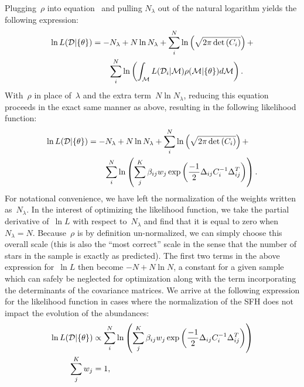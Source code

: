 \documentclass[ms.tex]{subfiles}
\begin{document}
Plugging~$\rho$ into equation~ and pulling
$N_\lambda$ out of the natural logarithm yields the following expression:
\begin{equation}\begin{split}
\ln L(\mathcal{D} | \{\theta\}) &= -N_\lambda + N \ln N_\lambda +
\sum_i^N \ln \left(\sqrt{2\pi \det{(C_i)}}\right) +
\\
&\qquad \sum_i^N \ln \left(
\int_{\mathcal{M}} L(\mathcal{D}_i | \mathcal{M}) \rho(\mathcal{M} | \{\theta\})
d\mathcal{M} \right).
\end{split}\end{equation}
With~$\rho$ in place of~$\lambda$ and the extra term~$N \ln N_\lambda$,
reducing this equation proceeds in the exact same manner as above, resulting
in the following likelihood function:
\begin{equation}\begin{split}
\ln L(\mathcal{D} | \{\theta\}) &= -N_\lambda + N \ln N_\lambda +
\sum_i^N \ln \left(\sqrt{2\pi \det{(C_i)}}\right) +
\\
&\qquad \sum_i^N \ln \left(
\sum_j^K \beta_{ij} w_j
\exp\left(\frac{-1}{2}\Delta_{ij} C_i^{-1} \Delta_{ij}^T\right)\right).
\end{split}\end{equation}
For notational convenience, we have left the normalization of the weights
written as~$N_\lambda$.
In the interest of optimizing the likelihood function, we take the partial
derivative of~$\ln L$ with respect to~$N_\lambda$ and find that it is equal to
zero when~$N_\lambda = N$.
Because~$\rho$ is by definition un-normalized, we can simply choose this
overall scale (this is also the ``most correct'' scale in the sense that the
number of stars in the sample is exactly as predicted).
The first two terms in the above expression for~$\ln L$ then become
$-N + N \ln N$, a constant for a given sample which can safely be neglected
for optimization along with the term incorporating the determinants of the
covariance matrices.
We arrive at the following expression for the likelihood function in cases
where the normalization of the SFH does not impact the evolution of the
abundances:
\begin{subequations}\begin{align}
\ln L(\mathcal{D} | \{\theta\}) &\propto \sum_i^N \ln \left( \sum_j^K \beta_{ij}
w_j \exp\left(\frac{-1}{2}\Delta_{ij} C_i^{-1} \Delta_{ij}^T\right) \right)
\label{eq:lnL_fracweight}
\\
\sum_j^K w_j &= 1,
\label{eq:lnL_fracweightsum}
\end{align}\end{subequations}
\end{document}
